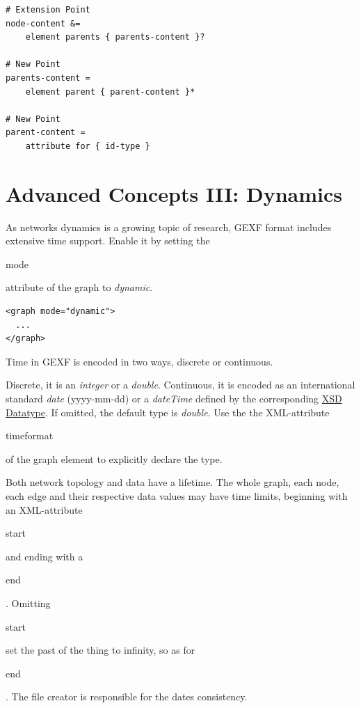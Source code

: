 \documentclass[a4paper,10pt]{article}
\begin{document}
\lstset{ style=rnc }
\begin{lstlisting}[caption={Phylogeny Specification},label=phylogenyRNC]
# Extension Point
node-content &=
    element parents { parents-content }?

# New Point
parents-content =
    element parent { parent-content }*

# New Point
parent-content =
    attribute for { id-type }
\end{lstlisting}

\section{Advanced Concepts III: Dynamics} \label{dynamics}

As networks dynamics is a growing topic of research, GEXF format includes extensive time support. Enable it by setting the \begin{footnotesize}mode\end{footnotesize} attribute of the graph to \textit{dynamic}.

\lstset{ style=gexf }
\begin{lstlisting}[caption={Dynamic Enabled!},label=dynamicEnabled]
<graph mode="dynamic">
  ...
</graph>
\end{lstlisting}

Time in GEXF is encoded in two ways, discrete or continuous.

Discrete, it is an \textit{integer} or a \textit{double}. Continuous, it is encoded as an international standard \textit{date} (yyyy-mm-dd) or a \textit{dateTime} defined by the corresponding \href{http://www.w3.org/TR/xmlschema-2/#dateTime}{XSD Datatype}. If omitted, the default type is \textit{double}. Use the the XML-attribute \begin{footnotesize}timeformat\end{footnotesize} of the graph element to explicitly declare the type.

Both network topology and data have a lifetime. The whole graph, each node, each edge and their respective data values may have time limits, beginning with an XML-attribute \begin{footnotesize}start\end{footnotesize} and ending with a \begin{footnotesize}end\end{footnotesize}. Omitting \begin{footnotesize}start\end{footnotesize} set the past of the thing to infinity, so as for \begin{footnotesize}end\end{footnotesize}. The file creator is responsible for the dates consistency.
\end{document}
